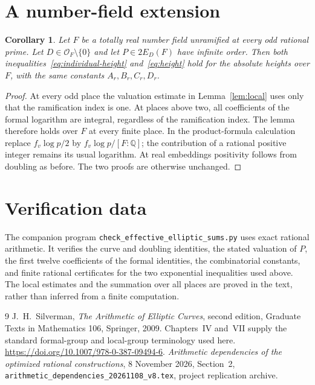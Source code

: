 \documentclass[11pt,a4paper]{article}
\newtheorem{corollary}[theorem]{Corollary}
\newcommand{\Q}{\mathbb Q}\newcommand{\Z}{\mathbb Z}
\begin{document}
\section{A number-field extension}

\begin{corollary}
Let $F$ be a totally real number field unramified at every
odd rational prime. Let $D\in\mathcal O_F\setminus\{0\}$
and let $P\in2E_D(F)$ have infinite order. Then both
inequalities~\eqref{eq:individual-height} and~\eqref{eq:height}
hold for the absolute heights over $F$, with the same
constants $A_r,B_r,C_r,D_r$.
\end{corollary}
\begin{proof}
At every odd place the valuation estimate in
Lemma~\ref{lem:local} uses only that the ramification index
is one. At places above two, all coefficients of the formal
logarithm are integral, regardless of the ramification
index. The lemma therefore holds over $F$ at every finite
place. In the product-formula calculation replace
$f_v\log p/2$ by $f_v\log p/[F:\Q]$; the contribution of
a rational positive integer remains its usual logarithm.
At real embeddings positivity follows from doubling as
before. The two proofs are otherwise unchanged.
\end{proof}

\section{Verification data}

The companion program
\nolinkurl{check_effective_elliptic_sums.py} uses exact rational
arithmetic. It verifies the curve and doubling identities,
the stated valuation of $P$, the first twelve coefficients
of the formal identities, the combinatorial constants, and
finite rational certificates for the two exponential
inequalities used above. The local estimates and the
summation over all places are proved in the text, rather
than inferred from a finite computation.

\begin{thebibliography}{9}
J.~H.~Silverman, \emph{The Arithmetic of Elliptic Curves},
second edition, Graduate Texts in Mathematics 106,
Springer, 2009. Chapters~IV and~VII supply the standard
formal-group and local-group terminology used here.
\url{https://doi.org/10.1007/978-0-387-09494-6}.
\emph{Arithmetic dependencies of the optimized rational
constructions}, 8 November 2026, Section~2,
\nolinkurl{arithmetic_dependencies_20261108_v8.tex},
project replication archive.
\end{thebibliography}
\end{document}
